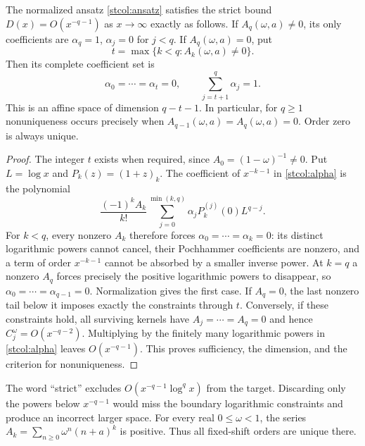 \begin{theorem}\label{stcol:classification}
The normalized ansatz \eqref{stcol:ansatz} satisfies the strict bound
$D(x)=O(x^{-q-1})$ as $x\to\infty$ exactly as follows.
If $A_q(\omega,a)\ne0$, its only coefficients are
$\alpha_q=1$, $\alpha_j=0$ for $j<q$.
If $A_q(\omega,a)=0$, put
\[
 t=\max\{k<q:A_k(\omega,a)\ne0\}.
\]
Then its complete coefficient set is
\begin{equation}\label{stcol:space}
 \alpha_0=\cdots=\alpha_t=0,
 \qquad \sum_{j=t+1}^q\alpha_j=1.
\end{equation}
This is an affine space of dimension $q-t-1$.  In particular, for
$q\ge1$ nonuniqueness occurs precisely when
$A_{q-1}(\omega,a)=A_q(\omega,a)=0$.  Order zero is always unique.
\end{theorem}
\begin{proof}
The integer $t$ exists when required, since $A_0=(1-\omega)^{-1}\ne0$.
Put $L=\log x$ and $P_k(z)=(1+z)_k$.  The coefficient of $x^{-k-1}$
in \eqref{stcol:alpha} is the polynomial
\begin{equation}\label{stcol:tail-polynomial}
 \frac{(-1)^k A_k}{k!}
     \sum_{j=0}^{\min(k,q)}\alpha_j P_k^{(j)}(0)L^{q-j}.
\end{equation}
For $k<q$, every nonzero $A_k$ therefore forces
$\alpha_0=\cdots=\alpha_k=0$: its distinct logarithmic powers cannot
cancel, their Pochhammer coefficients are nonzero, and a term of
order $x^{-k-1}$ cannot be absorbed by a smaller inverse power.
At $k=q$ a nonzero $A_q$ forces precisely the positive logarithmic
powers to disappear, so $\alpha_0=\cdots=\alpha_{q-1}=0$.
Normalization gives the first case.  If $A_q=0$, the last nonzero
tail below it imposes exactly the constraints through $t$.
Conversely, if these constraints hold, all surviving kernels have
$A_j=\cdots=A_q=0$ and hence $C_j^\omega=O(x^{-q-2})$.
Multiplying by the finitely many logarithmic powers in
\eqref{stcol:alpha} leaves $O(x^{-q-1})$.  This proves sufficiency,
the dimension, and the criterion for nonuniqueness.
\end{proof}

The word ``strict'' excludes $O(x^{-q-1}\log^q x)$ from the target.
Discarding only the powers below $x^{-q-1}$ would miss the boundary
logarithmic constraints and produce an incorrect larger space.
For every real $0\le\omega<1$, the series
$A_k=\sum_{n\ge0}\omega^n(n+a)^k$ is positive.  Thus all fixed-shift
orders are unique there.

